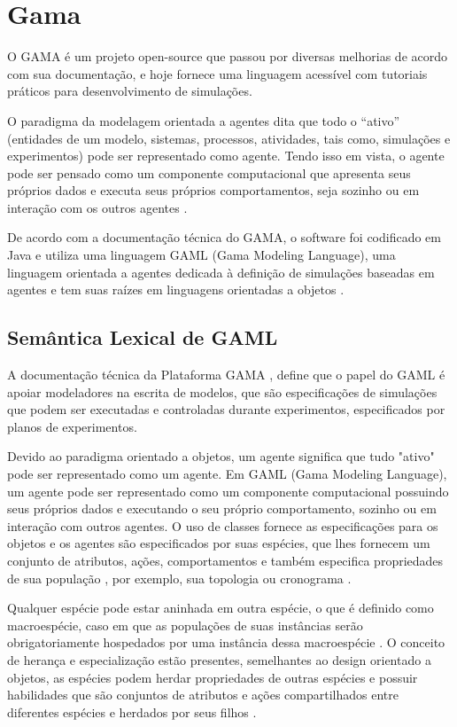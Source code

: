 \section{Gama}

O GAMA é um projeto open-source que passou por diversas melhorias de acordo com sua documentação, e hoje fornece uma linguagem acessível com tutoriais práticos para desenvolvimento de simulações. 

O paradigma da modelagem orientada a agentes dita que todo o “ativo” (entidades de um modelo, sistemas, processos, atividades, tais como, simulações e experimentos) pode ser representado como agente. Tendo isso em vista, o agente pode ser pensado como um componente computacional que apresenta seus próprios dados e executa seus próprios comportamentos, seja sozinho ou em interação com os outros agentes \cite{gamaplataform}. 

De acordo com a documentação técnica do GAMA, o software foi codificado em Java e utiliza uma linguagem GAML (Gama Modeling Language), uma linguagem orientada a agentes dedicada à definição de simulações baseadas em agentes e tem suas raízes em linguagens orientadas a objetos \cite{gamaplataform}.  


\subsection{Semântica Lexical de GAML}

A documentação técnica da Plataforma GAMA \cite{gamaplataform}, define que o papel do GAML é apoiar modeladores na escrita de modelos, que são especificações de simulações que podem ser executadas e controladas durante experimentos, especificados por planos de experimentos.

Devido ao paradigma orientado a objetos, um agente significa que tudo "ativo" pode ser representado como um agente. Em GAML (Gama Modeling Language), um agente pode ser representado como um componente computacional possuindo seus próprios dados e executando o  seu próprio comportamento, sozinho ou em interação com outros agentes. O uso de classes fornece as especificações para os objetos e os agentes são especificados por suas espécies, que lhes fornecem um conjunto de atributos, ações, comportamentos e também especifica propriedades de sua população , por exemplo, sua topologia ou cronograma \cite{gamaplataform}.

Qualquer espécie pode estar aninhada em outra espécie, o que é definido como macroespécie, caso em que as populações de suas instâncias serão obrigatoriamente hospedados por uma instância dessa macroespécie \cite{gamaplataform}. O conceito de herança e especialização estão presentes, semelhantes ao design orientado a objetos, as espécies podem herdar propriedades de outras espécies e possuir habilidades que são conjuntos de atributos e ações compartilhados entre diferentes espécies e herdados por seus filhos \cite{gamaplataform}.

